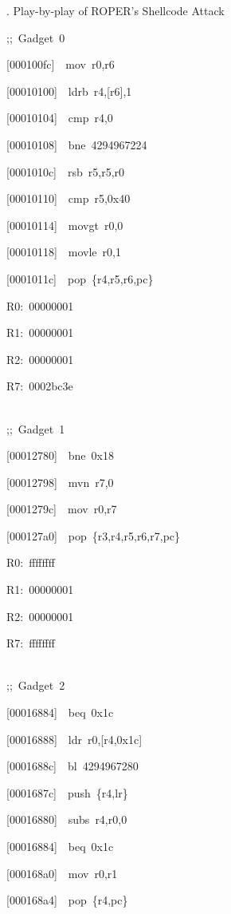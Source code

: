 \documentclass[9pt]{beamer}
\newcommand{\Gap} { \\ \ \vspace{8pt} }
\begin{document}
\begin{frame}{\theframenumber. Play-by-play of ROPER's Shellcode Attack}
\begin{multicols}{3}
\tiny
{\color{title};;~Gadget~0}

[000100fc]~~mov~r0,r6

[00010100]~~ldrb~r4,[r6],1

[00010104]~~cmp~r4,0

[00010108]~~bne~4294967224

[0001010c]~~rsb~r5,r5,r0

[00010110]~~cmp~r5,0x40

[00010114]~~movgt~r0,0

[00010118]~~movle~r0,1

[0001011c]~~pop~\{r4,r5,r6,pc\}
\vspace{4pt}

R0:~00000001

R1:~00000001

R2:~00000001

R7:~0002bc3e
\Gap

{\color{title};;~Gadget~1}

[00012780]~~bne~0x18

[00012798]~~mvn~r7,0

[0001279c]~~mov~r0,r7

[000127a0]~~pop~\{r3,r4,r5,r6,r7,pc\}
\vspace{4pt}

R0:~ffffffff

R1:~00000001

R2:~00000001

R7:~ffffffff
\Gap
\columnbreak


{\color{title};;~Gadget~2}

[00016884]~~beq~0x1c

[00016888]~~ldr~r0,[r4,0x1c]



\alert {[0001688c]~~bl~4294967280}

\alert {[0001687c]~~push~\{r4,lr\}}

[00016880]~~subs~r4,r0,0

[00016884]~~beq~0x1c

[000168a0]~~mov~r0,r1

[000168a4]~~pop~\{r4,pc\}
\vspace{4pt}



\end{multicols}
\end{frame}
\end{document}
